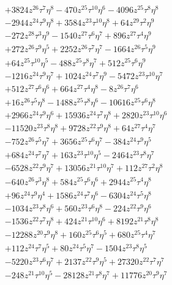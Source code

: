 {\begin{align*}
&+3824z^{26}\tau^{7}\eta^{8}-470z^{25}\tau^{10}\eta^{6}-4096z^{25}\tau^{8}\eta^{8}\\
&-2944z^{24}\tau^{9}\eta^{8}+3584z^{23}\tau^{10}\eta^{8}+64z^{29}\tau^{2}\eta^{9}\\
&-272z^{28}\tau^{3}\eta^{9}-1540z^{27}\tau^{6}\eta^{7}+896z^{27}\tau^{4}\eta^{9}\\
&+272z^{26}\tau^{9}\eta^{5}+2252z^{26}\tau^{7}\eta^{7}-1664z^{26}\tau^{5}\eta^{9}\\
&+64z^{25}\tau^{10}\eta^{5}-488z^{25}\tau^{8}\eta^{7}+512z^{25}\tau^{6}\eta^{9}\\
&-1216z^{24}\tau^{9}\eta^{7}+1024z^{24}\tau^{7}\eta^{9}-5472z^{23}\tau^{10}\eta^{7}\\
&+512z^{27}\tau^{6}\eta^{6}+664z^{27}\tau^{4}\eta^{8}-8z^{26}\tau^{7}\eta^{6}\\
&+16z^{26}\tau^{5}\eta^{8}-1488z^{25}\tau^{8}\eta^{6}-10616z^{25}\tau^{6}\eta^{8}\\
&+2966z^{24}\tau^{9}\eta^{6}+15936z^{24}\tau^{7}\eta^{8}+2820z^{23}\tau^{10}\eta^{6}\\
&-11520z^{23}\tau^{8}\eta^{8}+9728z^{22}\tau^{9}\eta^{8}+64z^{27}\tau^{4}\eta^{7}\\
&-752z^{26}\tau^{5}\eta^{7}+3656z^{25}\tau^{6}\eta^{7}-384z^{24}\tau^{9}\eta^{5}\\
&+684z^{24}\tau^{7}\eta^{7}+163z^{23}\tau^{10}\eta^{5}-2464z^{23}\tau^{8}\eta^{7}\\
&-6528z^{22}\tau^{9}\eta^{7}+13056z^{21}\tau^{10}\eta^{7}+112z^{27}\tau^{2}\eta^{8}\\
&-640z^{26}\tau^{3}\eta^{8}+584z^{25}\tau^{6}\eta^{6}+2944z^{25}\tau^{4}\eta^{8}\\
&+96z^{24}\tau^{9}\eta^{4}+1586z^{24}\tau^{7}\eta^{6}-6304z^{24}\tau^{5}\eta^{8}\\
&-1034z^{23}\tau^{8}\eta^{6}+560z^{23}\tau^{6}\eta^{8}-224z^{22}\tau^{9}\eta^{6}\\
&-1536z^{22}\tau^{7}\eta^{8}+424z^{21}\tau^{10}\eta^{6}+8192z^{21}\tau^{8}\eta^{8}\\
&-12288z^{20}\tau^{9}\eta^{8}+160z^{25}\tau^{6}\eta^{5}+680z^{25}\tau^{4}\eta^{7}\\
&+112z^{24}\tau^{7}\eta^{5}+80z^{24}\tau^{5}\eta^{7}-1504z^{23}\tau^{8}\eta^{5}\\
&-5220z^{23}\tau^{6}\eta^{7}+2137z^{22}\tau^{9}\eta^{5}+27320z^{22}\tau^{7}\eta^{7}\\
&-248z^{21}\tau^{10}\eta^{5}-28128z^{21}\tau^{8}\eta^{7}+11776z^{20}\tau^{9}\eta^{7}\\

\end{align*}}
